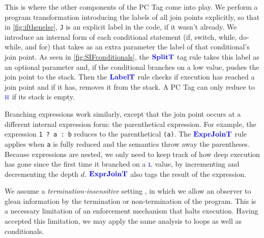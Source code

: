 \documentclass{llncs}
\begin{document}
{This is where the other components of the PC Tag come into play. We perform a program
transformation introducing the labels of all join points explicitly, so that in
\cref{fig:ifthenelse}, {\tt J} is an explicit label in the code, if it wasn't already.
We introduce an internal form of each conditional statement
(if, switch, while, do-while, and for) that takes as an extra parameter the label of
that conditional's join point. As seen in \cref{fig:SIFconditionals}, the
\(\color{blue} \mathbf{SplitT}\) tag rule takes this label as an optional parameter and, if
the conditional branches on a low value, pushes the join point to the stack.
Then the \(\color{blue} \mathbf{LabelT}\) rule checks if execution has reached a join point and
if it has, removes it from the stack. A PC Tag can only reduce to \(\textnormal{\color{blue} \sc h}\)
if its stack is empty.

Branching expressions work similarly, except that the join point occurs at a different
internal expression form: the parenthetical expression. For example, the expression
{\tt 1 ? a : b} reduces to the parenthetical {\tt (a)}. The \(\color{blue} \mathbf{ExprJoinT}\) rule
applies when {\tt a} is fully reduced and the semantics throw away the parentheses.
Because expressions are nested, we only need to keep track of how deep execution has
gone since the first time it branched on a \(\textnormal{\color{blue} \sc l}\) value, by incrementing and decrementing
the depth \(d\).  \(\color{blue} \mathbf{ExprJoinT}\) also tags the result of the expression.

We assume a {\em termination-insensitive} setting \cite{Askarov08:TINILeaks}, in which
we allow an observer to glean information by the termination or non-termination of
the program. This is a necessary limitation of an enforcement mechanism that halts
execution. Having accepted this limitation, we may apply the same analysis to loops
as well as conditionals.

}
\end{document}
